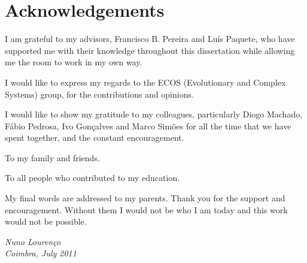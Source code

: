 \chapter*{Acknowledgements}
\renewcommand{\headrulewidth}{0pt}


I am grateful to my advisors, Francisco B. Pereira and Luís Paquete, who have supported me with their knowledge throughout this dissertation while allowing me the room to work in my own way.

I would like to express my regards to the ECOS (Evolutionary and Complex Systems) group, for the contributions and opinions.

I would like to show my gratitude to my colleagues, particularly Diogo Machado, Fábio Pedrosa, Ivo Gonçalves and Marco Simões for all the time that we have spent together, and the constant encouragement.

To my family and friends.

To all people who contributed to my education.

My final words are addressed to my parents. Thank you for the support and encouragement. Without them I would not be who I am today and this work would not be possible.
\vspace{4cm}

\emph{Nuno Lourenço \\ Coimbra, July 2011}

 



